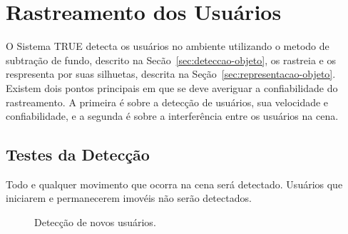 \section{Rastreamento dos Usuários}

	O Sistema TRUE detecta os usuários no ambiente utilizando o metodo de subtração
	de fundo, descrito na Secão~\ref{sec:deteccao-objeto}, os rastreia e os
	respresenta por suas silhuetas, descrita na	Seção~\ref{sec:representacao-objeto}.
	Existem dois pontos principais em que se deve averiguar a confiabilidade do
	rastreamento. A primeira é sobre a detecção de usuários, sua velocidade e
	confiabilidade, e a segunda é sobre a interferência entre os usuários na cena.
	
	\subsection{Testes da Detecção}
	
		Todo e qualquer movimento que ocorra na cena será detectado. Usuários que
		iniciarem e permanecerem imovéis não serão detectados.
		
		\begin{figure}[H]
			\begin{center}
			\end{center}
			\caption{Detecção de novos usuários.}
			\label{fig:testes_deteccao}
		\end{figure}
		
